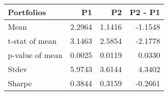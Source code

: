 \begin{tabular}{lrrr}
\toprule
Portfolios & P1 & P2 & P2 - P1 \\
\midrule
Mean & 2.2964 & 1.1416 & -1.1548 \\
t-stat of mean & 3.1463 & 2.5854 & -2.1778 \\
p-value of mean & 0.0025 & 0.0119 & 0.0330 \\
Stdev & 5.9743 & 3.6144 & 4.3402 \\
Sharpe & 0.3844 & 0.3159 & -0.2661 \\
\bottomrule
\end{tabular}
